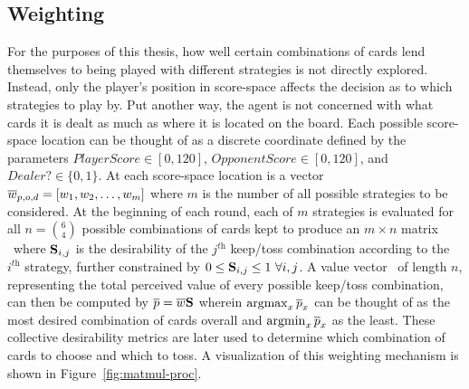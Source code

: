 

\subsection{Weighting}
\label{sec:dm-methods-weighting}



For the purposes of this thesis,
how well certain combinations of cards lend themselves to being played with 
different strategies is not directly explored.
%
Instead, only the player's position in score-space affects the decision as to
which strategies to play by.
%
Put another way, the agent is not concerned with  what cards it is dealt
as much as where it is located on the board.
%
Each possible score-space location can be thought of as a discrete coordinate
defined by the parameters
$\textit{PlayerScore} \in [0, 120]$,
$\textit{OpponentScore} \in [0, 120]$,
and
$\textit{Dealer?} \in \{0,1\}$.
%
At each score-space location is a vector $\overline{w}_{p,o,d} = [w_1,w_2,\ldots,w_m]$
where $m$ is the number of all possible strategies to be considered.
%
At the beginning of each round, each of $m$ strategies is evaluated for all
$n = {6 \choose 4}$ possible combinations of cards kept to produce an
$m \times n$ matrix \Smat\
where $\mathbf{S}_{i,j}$ is the desirability of the $j^{\textit{th}}$ keep/toss
combination according to the $i^{\textit{th}}$ strategy,
further constrained by
$0 \le \mathbf{S}_{i,j} \le 1\ \forall i,j$.
%
A value vector \pvec\ of length $n$,
representing the total perceived value of every possible keep/toss combination,
can then be computed by
$\overline{p} = \overline{w} \mathbf{S}$
wherein $\operatorname*{argmax}_{x}{\overline{p}_x}$ can be thought of as the most desired combination
of cards overall and $\operatorname*{argmin}_{x}{\overline{p}_x}$ as the least.
%
These collective desirability metrics are later used to determine which
combination of cards to choose and which to toss.
%
A visualization of this weighting mechanism is shown in
Figure~\ref{fig:matmul-proc}.




